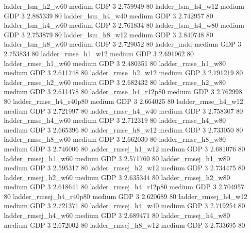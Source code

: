      ladder_lsm_h2_w60     medium      GDP                 3 2.759949 80
     ladder_lsm_h4_w12     medium      GDP                 3 2.885339 80
     ladder_lsm_h4_w40     medium      GDP                 3 2.742957 80
     ladder_lsm_h4_w60     medium      GDP                 3 2.761834 80
     ladder_lsm_h4_w80     medium      GDP                 3 2.753879 80
     ladder_lsm_h8_w12     medium      GDP                 3 2.840748 80
     ladder_lsm_h8_w60     medium      GDP                 3 2.729052 80
            ladder_mdd     medium      GDP                 3 2.753834 80
    ladder_rmse_h1_w12     medium      GDP                 3 2.691962 80
    ladder_rmse_h1_w60     medium      GDP                 3 2.480351 80
    ladder_rmse_h1_w80     medium      GDP                 3 2.611748 80
    ladder_rmse_h2_w12     medium      GDP                 3 2.791219 80
    ladder_rmse_h2_w60     medium      GDP                 3 2.682432 80
    ladder_rmse_h2_w80     medium      GDP                 3 2.611478 80
 ladder_rmse_h4_r12p80     medium      GDP                 3 2.762998 80
 ladder_rmse_h4_r40p80     medium      GDP                 3 2.664025 80
    ladder_rmse_h4_w12     medium      GDP                 3 2.721997 80
    ladder_rmse_h4_w40     medium      GDP                 3 2.758307 80
    ladder_rmse_h4_w60     medium      GDP                 3 2.712319 80
    ladder_rmse_h4_w80     medium      GDP                 3 2.665396 80
    ladder_rmse_h8_w12     medium      GDP                 3 2.733050 80
    ladder_rmse_h8_w60     medium      GDP                 3 2.662030 80
    ladder_rmse_h8_w80     medium      GDP                 3 2.746006 80
   ladder_rmsej_h1_w12     medium      GDP                 3 2.681076 80
   ladder_rmsej_h1_w60     medium      GDP                 3 2.571760 80
   ladder_rmsej_h1_w80     medium      GDP                 3 2.595317 80
   ladder_rmsej_h2_w12     medium      GDP                 3 2.734475 80
   ladder_rmsej_h2_w60     medium      GDP                 3 2.635344 80
   ladder_rmsej_h2_w80     medium      GDP                 3 2.618641 80
ladder_rmsej_h4_r12p80     medium      GDP                 3 2.704957 80
ladder_rmsej_h4_r40p80     medium      GDP                 3 2.620689 80
   ladder_rmsej_h4_w12     medium      GDP                 3 2.721371 80
   ladder_rmsej_h4_w40     medium      GDP                 3 2.719254 80
   ladder_rmsej_h4_w60     medium      GDP                 3 2.689471 80
   ladder_rmsej_h4_w80     medium      GDP                 3 2.672002 80
   ladder_rmsej_h8_w12     medium      GDP                 3 2.733695 80
